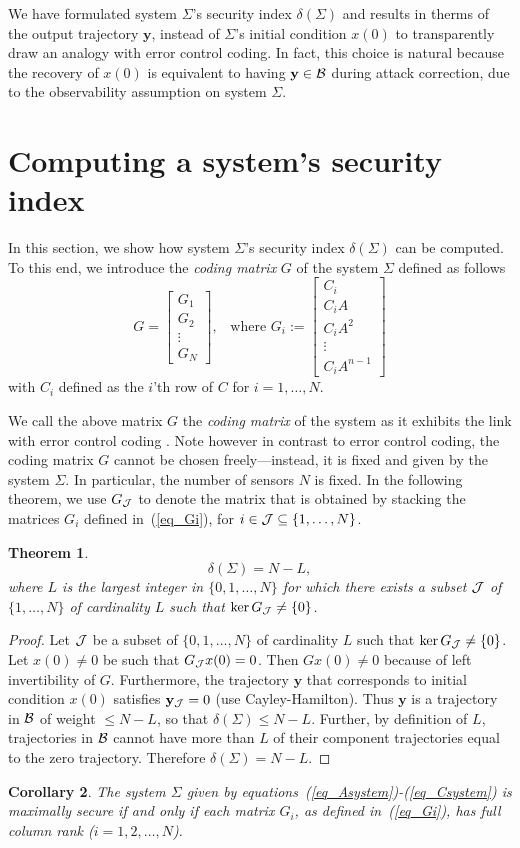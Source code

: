 \documentclass[letterpaper, 10 pt, conference]{ieeeconf}
\newcommand{\B}{{\cal B}}
\newcommand{\J}{{\cal J}}
\newcommand{\ybold}{\mathbf{y}}
\newcommand{\beq}{\begin{equation}}
\newcommand{\eeq}{\end{equation}}
\newcommand{\bmat}{\left[ \begin{array}}
\newcommand{\emat}{\end{array} \right]}
\newtheorem{thm}{Theorem}[section]
\newtheorem{cor}[thm]{Corollary}
\begin{document}
We have formulated system $\Sigma$'s security index $\delta(\Sigma)$ and results in therms of the output trajectory $\ybold$, instead of $\Sigma$'s initial condition $x(0)$ to transparently draw an analogy with error control coding. In fact, this choice is natural because the recovery of $x(0)$ is equivalent to having $\ybold \in \B$ during attack correction, due to the observability assumption on system $\Sigma$.

\section{Computing a system's security index}
In this section, we show how system $\Sigma$'s security index $\delta(\Sigma)$ can be computed. To this end, we introduce the {\em coding matrix} $G$ of the system $\Sigma$ defined as follows 
\beq
G = \bmat{c} G_1 \\ G_2 \\ \vdots \\ G_N \emat,\;\;\;\mbox{where }G_i := \bmat{c} C_i \\
C_iA
\\
C_iA^2 \\
\vdots \\
C_iA^{n-1}
\emat\label{eq_Gi}
\eeq
with $C_i$ defined as the $i$'th row of $C$ for $i=1, \ldots , N$.

We call the above matrix $G$ the {\em coding matrix} of the system as it exhibits the link with error control coding \cite{leeSE2015ECC}. Note however in contrast to error control coding, the coding matrix $G$ cannot be chosen freely---instead, it is fixed and given by the system $\Sigma$. In particular, the number of sensors $N$ is fixed.  In the following theorem, we use $G_\J $ to denote the matrix that is obtained by stacking the matrices $G_i$ defined in~(\ref{eq_Gi}), for $i\in \J \subseteq \{1,\ldots , N\}$.

\begin{thm}\label{thm_GJ}
\[
\delta (\Sigma ) = N-L, 
\]
where $L$ is the largest integer in $\{0,1,\ldots , N\}$ for which there exists a subset $\J$ of $\{1,\ldots , N\}$ of cardinality $L$ such that $\ker G_\J \neq \{ 0 \}$.
\end{thm}
\begin{proof}
		Let $\J$ be a subset of $\{0,1,\ldots , N\}$ of cardinality $L$ such that $\ker G_\J \neq \{ 0 \}$. Let $x(0) \neq 0$ be such that $G_\J  x(0) =0$. Then $Gx(0) \neq 0$  because of left invertibility of $G$. Furthermore, the trajectory $\ybold$ that corresponds to initial condition $x(0)$ satisfies $\ybold_\J = 0$ (use Cayley-Hamilton). Thus $\ybold$ is a trajectory in $\B$ of weight $\leq N-L$, so that $\delta (\Sigma ) \leq N-L$. Further, by definition of $L$, trajectories in $\B$ cannot have more than $L$ of their component trajectories equal to the zero trajectory. Therefore $\delta (\Sigma ) = N-L$.
\end{proof}
\begin{cor} \label{cor:max_secure_G}
The system $\Sigma$ given by equations~(\ref{eq_Asystem})-(\ref{eq_Csystem}) is maximally secure if and only if each matrix $G_i$, as defined in~(\ref{eq_Gi}), has full column rank ($i=1,2,\ldots , N$).
\end{cor}
\end{document}
